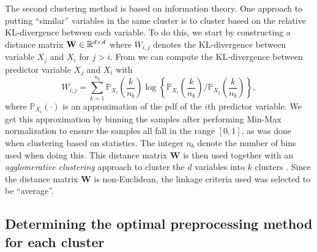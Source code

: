 \documentclass{statsmsc}
\begin{document}
{The second clustering method is based on information theory.
One approach to putting ``similar'' variables in the same cluster is to cluster based on the
relative \ac{KL-divergence} between each variable.
To do this, we start by constructing a
distance matrix $\mathbf{W} \in \mathbb{R}^{d \times d}$ where $W_{i,j}$ denotes the
\ac{KL-divergence} between variable $X_j$ and $X_i$ for $j > i$. From
\citep{mackay} we can compute the \ac{KL-divergence} between predictor variable $X_j$ and $X_i$
with
\begin{equation}
    W_{i,j}= \sum^{n_{b }}_{k=1} \mathbb{P}_{X_i}\left( \frac{k}{n_{b }}  \right)
    \log\left\{
    \mathbb{P}_{X_i}\left( \frac{k}{n_{b }}  \right) \bigg/
    \mathbb{P}_{X_j}\left( \frac{k}{n_{b }}  \right)
\right\},
\end{equation}
where $\mathbb{P}_{X_i}(\cdot)$ is an approximation of the \ac{pdf} of the $i$th predictor variable.
We get this approximation by binning the samples after performing Min-Max normalization to ensure
the samples all fall in the range $[0,1]$, as was done when clustering based on statistics.
The integer $n_{b}$ denote the number of bins used when doing this.
This distance matrix $\mathbf{W}$ is then used together with an \textit{agglomerative clustering}
approach to cluster the $d$ variables into $k$ clusters
\citep{hierarchical_clustering}. Since the distance matrix $\mathbf{W}$ is
non-Euclidean, the linkage criteria used was selected to be ``average''.


\subsection{Determining the optimal preprocessing method for each cluster}%
\label{sub:Determining the optimal preprocessing method for each clusterch cluster}

}
\end{document}
